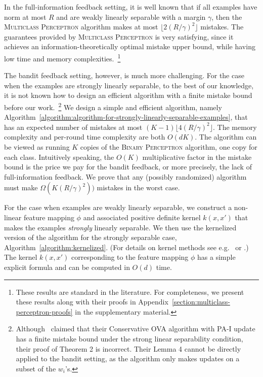 In the full-information feedback setting, it is well known that if all examples
have norm at most $R$ and are weakly linearly separable with a margin $\gamma$,
then the \textsc{Multiclass Perceptron} algorithm makes at most $\lfloor
2(R/\gamma)^2 \rfloor$ mistakes. The guarantees provided by \textsc{Multiclass
Perceptron} is very satisfying, since it achieves an information-theoretically
optimal mistake upper bound, while having low time and memory
complexities.~\footnote{These results are standard in the literature. For
completeness, we present these results along with their proofs in
Appendix~\ref{section:multiclass-perceptron-proofs} in the supplementary
material.}

The bandit feedback setting, however, is much more challenging. For the case
when the examples are strongly linearly separable, to the best of our knowledge,
it is not known how to design an efficient algorithm with a finite mistake bound
before our work.~\footnote{Although~\cite{Chen-Chen-Zhang-Chen-Zhang-2009}
claimed that their Conservative OVA algorithm with PA-I update has a finite
mistake bound under the strong linear separability condition, their proof of
Theorem 2 is incorrect. Their Lemma 4 cannot be directly applied to the bandit
setting, as the algorithm only makes updates on a subset of the $w_i$'s.} We
design a simple and efficient algorithm, namely
Algorithm~\ref{algorithm:algorithm-for-strongly-linearly-separable-examples},
that has an expected number of mistakes at most $(K-1) \lfloor 4(R/\gamma)^2
\rfloor$. The memory complexity and per-round time complexity are both $O(dK)$.
The algorithm can be viewed as running $K$ copies of the \textsc{Binary
Perceptron} algorithm, one copy for each class. Intuitively speaking, the $O(K)$
multiplicative factor in the mistake bound is the price we pay for the bandit
feedback, or more precisely, the lack of full-information feedback. We prove
that any (possibly randomized) algorithm must make $\Omega(K (R/\gamma)^2))$
mistakes in the worst case.

For the case when examples are weakly linearly separable, we construct a
non-linear feature mapping $\phi$ and associated positive definite kernel
$k(x,x')$ that makes the examples \emph{strongly} linearly separable. We then
use the kernelized version of the algorithm for the strongly separable case,
Algorithm~\ref{algorithm:kernelized}. (For details on kernel methods see
e.g.~\citet{Scholkopf-Smola-2002} or \citet{Shawe-Taylor-Cristianini-2004}.)
The kernel $k(x,x')$ corresponding to the feature mapping $\phi$ has a simple
explicit formula and can be computed in $O(d)$ time.

